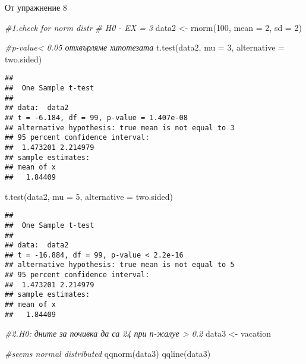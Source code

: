 \documentclass[
]{article}
\newenvironment{Shaded}{\begin{snugshade}}{\end{snugshade}}
\newcommand{\AttributeTok}[1]{\textcolor[rgb]{0.77,0.63,0.00}{#1}}
\newcommand{\CommentTok}[1]{\textcolor[rgb]{0.56,0.35,0.01}{\textit{#1}}}
\newcommand{\DecValTok}[1]{\textcolor[rgb]{0.00,0.00,0.81}{#1}}
\newcommand{\FunctionTok}[1]{\textcolor[rgb]{0.00,0.00,0.00}{#1}}
\newcommand{\NormalTok}[1]{#1}
\newcommand{\OtherTok}[1]{\textcolor[rgb]{0.56,0.35,0.01}{#1}}
\newcommand{\StringTok}[1]{\textcolor[rgb]{0.31,0.60,0.02}{#1}}
\begin{document}
От упражнение 8

\begin{Shaded}
\begin{Highlighting}[]
\CommentTok{\#1.check for norm distr}
\CommentTok{\# H0 {-} EX = 3}
\NormalTok{data2 }\OtherTok{\textless{}{-}} \FunctionTok{rnorm}\NormalTok{(}\DecValTok{100}\NormalTok{, }\AttributeTok{mean =} \DecValTok{2}\NormalTok{, }\AttributeTok{sd =} \DecValTok{2}\NormalTok{)}

\CommentTok{\#p{-}value\textless{} 0.05 отхвърляме хипотезата}
\FunctionTok{t.test}\NormalTok{(data2, }\AttributeTok{mu =} \DecValTok{3}\NormalTok{, }\AttributeTok{alternative =} \StringTok{\textquotesingle{}two.sided\textquotesingle{}}\NormalTok{)}
\end{Highlighting}
\end{Shaded}

\begin{verbatim}
## 
##  One Sample t-test
## 
## data:  data2
## t = -6.184, df = 99, p-value = 1.407e-08
## alternative hypothesis: true mean is not equal to 3
## 95 percent confidence interval:
##  1.473201 2.214979
## sample estimates:
## mean of x 
##   1.84409
\end{verbatim}

\begin{Shaded}
\begin{Highlighting}[]
\FunctionTok{t.test}\NormalTok{(data2, }\AttributeTok{mu =} \DecValTok{5}\NormalTok{, }\AttributeTok{alternative =} \StringTok{\textquotesingle{}two.sided\textquotesingle{}}\NormalTok{)}
\end{Highlighting}
\end{Shaded}

\begin{verbatim}
## 
##  One Sample t-test
## 
## data:  data2
## t = -16.884, df = 99, p-value < 2.2e-16
## alternative hypothesis: true mean is not equal to 5
## 95 percent confidence interval:
##  1.473201 2.214979
## sample estimates:
## mean of x 
##   1.84409
\end{verbatim}

\begin{Shaded}
\begin{Highlighting}[]
\CommentTok{\#2.H0: дните за почивка да са 24 при п{-}жалуе \textgreater{} 0.2}
\NormalTok{data3 }\OtherTok{\textless{}{-}}\NormalTok{ vacation}

\CommentTok{\#seems normal distributed}
\FunctionTok{qqnorm}\NormalTok{(data3)}
\FunctionTok{qqline}\NormalTok{(data3)}
\end{Highlighting}
\end{Shaded}
\end{document}
